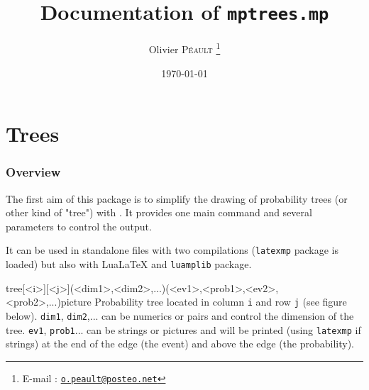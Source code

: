 \documentclass[11pt,a4paper,english]{article}
\begin{document}
\title{Documentation of \texttt{mptrees.mp}}
\date{\today}
\author{Olivier \textsc{Péault}%
\footnote{E-mail : \href{mailto:o.peault@posteo.net}{\texttt{o.peault@posteo.net}}}}
\maketitle

\setcounter{tocdepth}{2}

\setlength{\columnsep}{25pt}
\tableofcontents
\setlength{\columnsep}{10pt}


\newcommand{\ijc}{[i][j]}

\reversemarginpar



\part{Trees}

\section{Overview}

The first aim of this package is to simplify the drawing of probability trees (or other kind of "tree") with \MP. It provides one main command and several parameters to control the output.

It can be used in standalone files with two compilations (\verb|latexmp| package is loaded) but  also  with Lua\LaTeX{} and \verb|luamplib| package.


\begin{rpobjet}{tree[<i>][<j>](<dim1>,<dim2>,...)(<ev1>,<prob1>,<ev2>,<prob2>,...)}{picture}
Probability tree located in column \verb|i| and row \verb|j| (see figure below). \verb|dim1|, \verb|dim2|,... can be numerics or pairs and control the dimension of the tree. \verb|ev1|, \verb|prob1|... can be strings or pictures and will be printed (using \verb|latexmp| if strings) at the end of the edge (the event) and above the edge (the probability).


\end{rpobjet}
\end{document}
